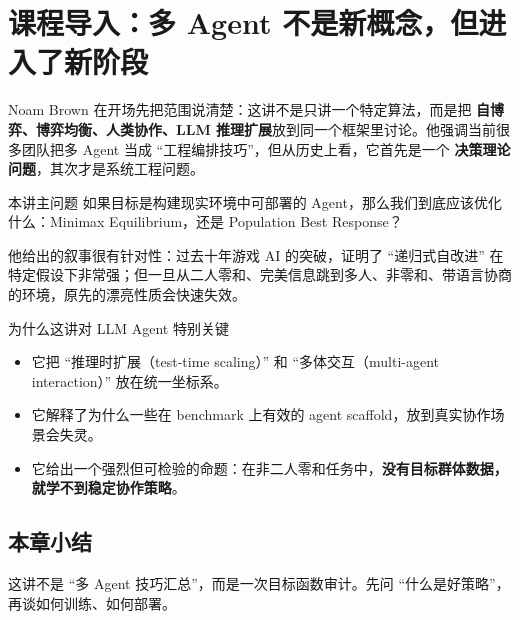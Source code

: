 \section{课程导入：多 Agent 不是新概念，但进入了新阶段}

Noam Brown 在开场先把范围说清楚：这讲不是只讲一个特定算法，而是把 \textbf{自博弈、博弈均衡、人类协作、LLM 推理扩展}放到同一个框架里讨论。他强调当前很多团队把多 Agent 当成 ``工程编排技巧''，但从历史上看，它首先是一个 \textbf{决策理论问题}，其次才是系统工程问题。

\begin{importantbox}{本讲主问题}
如果目标是构建现实环境中可部署的 Agent，那么我们到底应该优化什么：Minimax Equilibrium，还是 Population Best Response？
\end{importantbox}

他给出的叙事很有针对性：过去十年游戏 AI 的突破，证明了 ``递归式自改进'' 在特定假设下非常强；但一旦从二人零和、完美信息跳到多人、非零和、带语言协商的环境，原先的漂亮性质会快速失效。

\begin{knowledgebox}{为什么这讲对 LLM Agent 特别关键}
\begin{itemize}
    \item 它把 ``推理时扩展（test-time scaling）'' 和 ``多体交互（multi-agent interaction）'' 放在统一坐标系。
    \item 它解释了为什么一些在 benchmark 上有效的 agent scaffold，放到真实协作场景会失灵。
    \item 它给出一个强烈但可检验的命题：在非二人零和任务中，\textbf{没有目标群体数据，就学不到稳定协作策略}。
\end{itemize}
\end{knowledgebox}

\subsection{本章小结}
这讲不是 ``多 Agent 技巧汇总''，而是一次目标函数审计。先问 ``什么是好策略''，再谈如何训练、如何部署。

